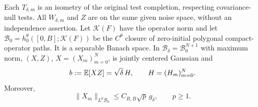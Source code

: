 \begin{lemma}\label{L:raw-block-inputs}
  Each $T_{\delta,m}$ is an isometry of the original test completion, respecting
  covariance-null tests. All $W_{\delta,m}$ and $Z$ are on the same given noise
  space, without an independence assertion. Let $\mathcal{K}(F)$ have the
  operator norm and let $\mathscr{B}_0 = h_0^\theta([0,B];\mathcal{K}(F))$ be
  the $C^\theta$ closure of zero-initial polygonal compact-operator paths. It is
  a separable Banach space. In $\mathscr{B}_\delta = \mathscr{B}_0^{N+1}$ with
  maximum norm, $(X,Z)$, $X = (X_m)_{m=0}^N$, is jointly centered Gaussian and
  \begin{equation}\label{E:raw-block-covariance}
    b:=\mathbb{E}[XZ]=\sqrt\delta\,H,\qquad H=(H_m)_{m=0}^N.
  \end{equation}
  Moreover,
  \begin{equation}\label{E:raw-block-moments}
    \|X_m\|_{L^p\mathscr{B}_0}
    \le C_{R,B}\sqrt p\,g_\delta,\qquad p\ge1.
  \end{equation}
\end{lemma}

